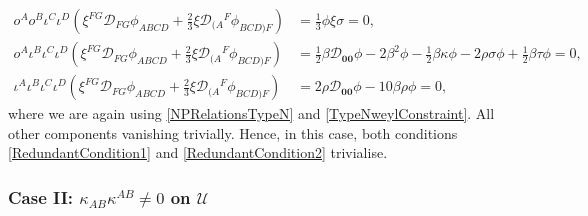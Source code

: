 \documentclass[10pt,a4paper]{article}
\newcommand\omicron{o}
\theoremstyle{plain}
\begin{document}
\begin{align*}
\omicron^A\omicron^B\iota^C\iota^D\left(\xi^{FG}\mathcal{D}_{FG}\phi_{ABCD} + \tfrac{2}{3}\xi\mathcal{D}_{(A}{}^F\phi_{BCD)F}\right)&=\tfrac{1}{3}\phi \xi \sigma=0,\\
\omicron^A\iota^B\iota^C\iota^D\left(\xi^{FG}\mathcal{D}_{FG}\phi_{ABCD} + \tfrac{2}{3}\xi\mathcal{D}_{(A}{}^F\phi_{BCD)F}\right)&= \tfrac{1}{2} \beta \mathcal{D}_{\bm0\bm0}\phi-2 \beta^2 \phi -  \tfrac{1}{2} \beta \kappa \phi - 2 \rho \sigma \phi + \tfrac{1}{2} \beta \tau \phi =0,\\
\iota^A\iota^B\iota^C\iota^D\left(\xi^{FG}\mathcal{D}_{FG}\phi_{ABCD} + \tfrac{2}{3}\xi\mathcal{D}_{(A}{}^F\phi_{BCD)F}\right) &= 2 \rho \mathcal{D}_{\bm0\bm0}\phi-10 \beta \rho \phi =0,
\end{align*}
where we are again using \eqref{NPRelationsTypeN} and \eqref{TypeNweylConstraint}. All other components vanishing trivially. Hence, in this case, both conditions \eqref{RedundantCondition1} and \eqref{RedundantCondition2} trivialise. 


\subsubsection{Case II: $\kappa_{AB}\kappa^{AB}\neq 0$ on $\mathcal{U}$}\label{TypeDCase}
\end{document}
